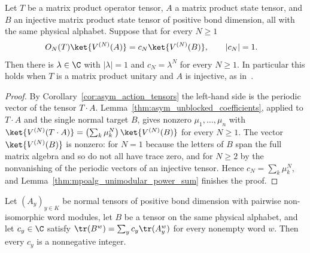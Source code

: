 \begin{lemma}%
    \label{thm:mpoalg_length_dependent_phase_power}
    \leanok
    Let $T$ be a matrix product operator tensor, $A$ a matrix product state
    tensor, and $B$ an injective matrix product state tensor of positive bond
    dimension, all with the same physical alphabet. Suppose that for every
    $N\geq1$
    \begin{align}
        O_N(T)\ket{V^{(N)}(A)} & =c_N\ket{V^{(N)}(B)},
        \qquad |c_N|=1.
        \notag
    \end{align}
    Then there is $\lambda\in\C$ with $|\lambda|=1$ and $c_N=\lambda^N$ for
    every $N\geq1$. In particular this holds when $T$ is a matrix product
    unitary and $A$ is injective, as
    in~\cite[Section~II.B]{GarreRubioSchuch2024DomainWall}.
\end{lemma}

\begin{proof}
    \leanok
    By Corollary~\ref{cor:asym_action_tensors} the left-hand side is the
    periodic vector of the tensor $T\cdot A$. Lemma~\ref{thm:asym_unblocked_coefficients},
    applied to $T\cdot A$ and the single normal target $B$, gives nonzero
    $\mu_1,\ldots,\mu_n$ with
    $\ket{V^{(N)}(T\cdot A)}=\left(\sum_k\mu_k^N\right)\ket{V^{(N)}(B)}$ for
    every $N\geq1$. The vector $\ket{V^{(N)}(B)}$ is nonzero: for $N=1$
    because the letters of $B$ span the full matrix algebra and so do not all
    have trace zero, and for $N\geq2$ by the nonvanishing of the periodic
    vectors of an injective tensor. Hence $c_N=\sum_k\mu_k^N$, and
    Lemma~\ref{thm:mpoalg_unimodular_power_sum} finishes the proof.
\end{proof}

\begin{lemma}%
    \label{thm:mpoalg_multiblock_trace_integral}
    \leanok
    Let $(A_y)_{y\in K}$ be normal tensors of positive bond dimension with
    pairwise non-isomorphic word modules, let $B$ be a tensor on the same
    physical alphabet, and let $c_y\in\C$ satisfy
    $\tr(B^w)=\sum_yc_y\tr(A_y^w)$ for every nonempty word $w$. Then every
    $c_y$ is a nonnegative integer.
\end{lemma}

